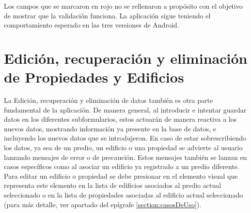 Los campos que se marcaron en rojo no se rellenaron a propósito con el objetivo de mostrar que la
validación funciona. La aplicación sigue teniendo el comportamiento esperado en las tres versiones de Android.

\pagebreak
\section{Edición, recuperación y eliminación de Propiedades y Edificios}
La Edición, recuperación y eliminación de datos también es otra parte fundamental de la aplicación. De manera general, al introducir e intentar guardar datos en
los diferentes subformularios, estos actuarán de manera reactiva a los nuevos datos, mostrando información ya presente en la base de datos, e incluyendo los nuevos datos que
se introdujeron. En caso de estar sobrescribiendo los datos, ya sea de un predio, un edificio o una propiedad se advierte al usuario lanzando mensajes de error o de precaución.
Estos mensajes también se lanzan en casos específicos como al asociar un edificio ya registrado a un predio diferente. Para editar un edificio o propiedad se debe presionar
en el elemento visual que representa este elemento en la lista de edificios asociados al predio actual seleccionado o en la lista de propiedades asociadas al edificio actual
seleccionado (para más detalle, ver apartado del epígrafe \ref{section:casosDeUso}).
